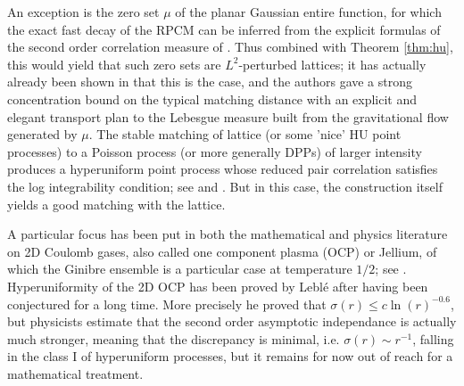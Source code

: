 \documentclass[12pt]{article}
\newcommand{\1}{\mathbf{1}}
\newcommand{\REMOVE}[1]{}
\renewcommand{\footnote}[1]{}
\begin{document}
{{{{ An exception is the zero set $ \mu $ of the planar Gaussian  {entire } function, for which the exact fast decay of the RPCM can be inferred from the explicit formulas of the second order correlation measure of  \cite[Section 3]{hough2009zeros}. {Thus combined with Theorem \ref{thm:hu}, this} would yield that such zero sets are $L^2$-perturbed lattices; it has actually already been shown in  \cite{nazarov2007transportation} that this is the case, and the authors gave a strong concentration bound on the typical matching distance with an explicit and elegant transport plan to the Lebesgue measure built from the gravitational flow generated by $ \mu $. {The stable matching of lattice (or some 'nice' HU point processes) to a Poisson process (or more generally DPPs) of larger intensity produces a hyperuniform point process whose reduced pair correlation satisfies the log integrability condition; see \cite[Proposition 8.2]{andreas2020hyperuniform} {and \cite{Lotz2023}}. But in this case, the construction itself yields a good matching with the lattice.}

A particular focus has been put in both the mathematical and physics literature on 2D Coulomb gases, also called one component plasma {(OCP)} or Jellium, of which the Ginibre ensemble is a particular case at temperature $1/2$; see \cite{torquato2018hyperuniform,leble,serfaty}.
Hyperuniformity of the 2D OCP has been proved by Lebl\'e  \cite{leble} after having been conjectured for a long time. More precisely he proved that $ \sigma (r)\leqslant c\ln(r)^{-0.6}$, but physicists  estimate that the second order asymptotic independance is actually much stronger, meaning that the discrepancy is minimal, i.e. $ \sigma (r)\sim r^{- 1}$, falling in the class I of hyperuniform processes, but it remains for now out of reach for a mathematical treatment.

\REMOVE{\subsubsection{Barely hyperuniform case}  \footnote{remove all?}

}}}}}
\end{document}
